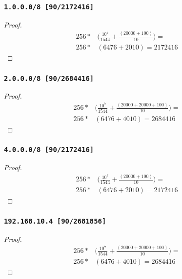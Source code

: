 \documentclass[12pt, times]{simauth}
\begin{document}
\begin{minipage}[t]{0.45\linewidth}
\subsubsection{\texttt{1.0.0.0/8 [90/2172416]}}
\begin{proof}
    \begin{align*}
        256 *& \bigg(\frac{10^7}{1544} + \frac{(20000 + 100)}{10}\bigg) = \\
        256 *& (6476 + 2010) = 2172416
    \end{align*}
\end{proof}
\subsubsection{\texttt{2.0.0.0/8 [90/2684416]}}
\begin{proof}
\begin{align*}
256 *& \bigg(\frac{10^7}{1544} + \frac{(20000 + 20000 + 100)}{10}\bigg) = \\
256 *& (6476 + 4010) = 2684416
\end{align*}
\end{proof}
\end{minipage} \hfill
\begin{minipage}[t]{0.45\linewidth}  
\subsubsection{\texttt{4.0.0.0/8 [90/2172416]}}
\begin{proof}
    \begin{align*}
        256 *& \bigg(\frac{10^7}{1544} + \frac{(20000 + 100)}{10}\bigg) = \\
        256 *& (6476 + 2010) = 2172416
    \end{align*}
\end{proof}
\subsubsection{\texttt{192.168.10.4 [90/2681856]}}
\begin{proof}
\begin{align*}
256 *& \bigg(\frac{10^7}{1544} + \frac{(20000 + 20000 + 100)}{10}\bigg) = \\
256 *& (6476 + 4010) = 2684416
\end{align*}
\end{proof}

\end{minipage}
\end{document}
